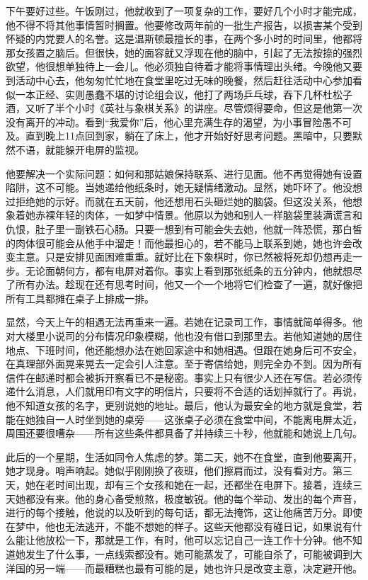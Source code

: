 下午要好过些。午饭刚过，他就收到了一项复杂的工作，要好几个小时才能完成，他不得不将其他事情暂时搁置。他要修改两年前的一批生产报告，以损害某个受到怀疑的内党要人的名誉。这是温斯顿最擅长的事，在两个多小时的时间里，他都将那女孩置之脑后。但很快，她的面容就又浮现在他的脑中，引起了无法按捺的强烈欲望，他很想单独待上一会儿。他必须独自待着才能将事情理出头绪。今晚他又要到活动中心去，他匆匆忙忙地在食堂里吃过无味的晚餐，然后赶往活动中心参加看似一本正经、实则愚蠢不堪的讨论组会议，他打了两场乒乓球，吞下几杯杜松子酒，又听了半个小时《英社与象棋关系》的讲座。尽管烦得要命，但这是他第一次没有离开的冲动。看到``我爱你''后，他心里充满生存的渴望，为小事冒险愚不可及。直到晚上11点回到家，躺在了床上，他才开始好好思考问题。黑暗中，只要默然不语，就能躲开电屏的监视。

他要解决一个实际问题：如何和那姑娘保持联系、进行见面。他不再觉得她有设置陷阱，这不可能。当她递给他纸条时，她无疑情绪激动。显然，她吓坏了。他没想过拒绝她的示好。而就在五天前，他还想用石头砸烂她的脑袋。但这没关系，他想象着她赤裸年轻的肉体，一如梦中情景。他原以为她和别人一样脑袋里装满谎言和仇恨，肚子里一副铁石心肠。只要一想到有可能会失去她，他就一阵恐慌，那白皙的肉体很可能会从他手中溜走！而他最担心的，若不能马上联系到她，她也许会改变主意。只是安排见面困难重重。就好比在下象棋时，你已然被将死却仍想再走一步。无论面朝何方，都有电屏对着你。事实上看到那张纸条的五分钟内，他就想尽了所有办法。趁现在还有思考时间，他又一个一个地将它们检查了一遍，就好像把所有工具都摊在桌子上排成一排。

显然，今天上午的相遇无法再重来一遍。若她在记录司工作，事情就简单得多。他对大楼里小说司的分布情况印象模糊，他也没有借口到那里去。若他知道她的居住地点、下班时间，他还能想办法在她回家途中和她相遇。但跟在她身后可不安全，在真理部外面晃来晃去一定会引人注意。至于寄信给她，则完全办不到。因为所有信件在邮递时都会被拆开察看已不是秘密。事实上只有很少人还在写信。若必须传递什么消息，人们就用印有文字的明信片，只要将不合适的话划掉就行了。再说，他不知道女孩的名字，更别说她的地址。最后，他认为最安全的地方就是食堂，若能在她独自一人时坐到她的桌旁——这张桌子必须在食堂中间，不能离电屏太近，周围还要很嘈杂——所有这些条件都具备了并持续三十秒，他就能和她说上几句。

此后的一个星期，生活如同令人焦虑的梦。第二天，她不在食堂，直到他要离开，她才现身。哨声响起。她似乎刚刚换了夜班，他们擦肩而过，没有看对方。第三天，她在老时间出现，却有三个女孩和她在一起，还都坐在电屏下。接着，连续三天她都没有来。他的身心备受煎熬，极度敏锐。他的每个举动、发出的每个声音，进行的每个接触，他说的以及听到的每句话，都无法掩饰，这让他痛苦万分。即使在梦中，他也无法逃开，不能不想她的样子。这些天他都没有碰日记，如果说有什么能让他放松一下，那就是工作，有时，他可以忘记自己一连工作十分钟。他不知道她发生了什么事，一点线索都没有。她可能蒸发了，可能自杀了，可能被调到大洋国的另一端——而最糟糕也最有可能的是，她也许只是改变主意，决定避开他。

